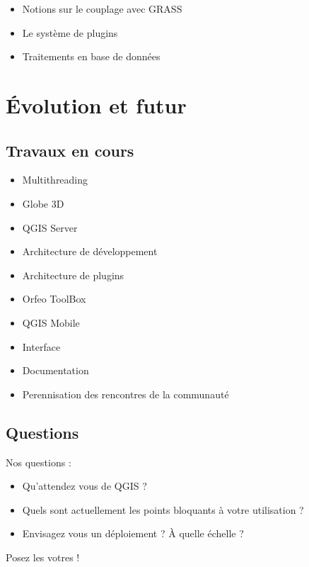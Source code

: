 \begin{itemize}[label=--]
\item Notions sur le couplage avec GRASS
\item Le système de plugins
\item Traitements en base de données
\end{itemize}

\section{Évolution et futur}
\subsection{Travaux en cours}
\begin{itemize}[label=--]
\item Multithreading
\item Globe 3D
\item QGIS Server
\item Architecture de développement
\item Architecture de plugins
\item Orfeo ToolBox
\item QGIS Mobile
\item Interface
\item Documentation
\item Perennisation des rencontres de la communauté
\end{itemize}
\subsection{Questions}
Nos questions :
\begin{itemize}[label=--]
\item Qu'attendez vous de QGIS ?
\item Quels sont actuellement les points bloquants à votre utilisation ?
\item Envisagez vous un déploiement ? À quelle échelle ?
\end{itemize}

Posez les votres !

